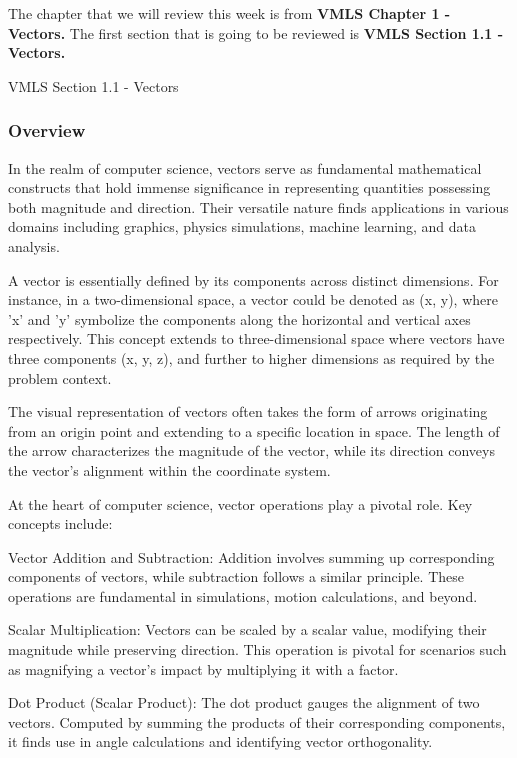 The chapter that we will review this week is from \textbf{VMLS Chapter 1 - Vectors.} The first section that is going to be reviewed is \textbf{VMLS Section 1.1 - Vectors.}

\begin{notes}{VMLS Section 1.1 - Vectors}
    \subsubsection*{Overview}

    In the realm of computer science, vectors serve as fundamental mathematical constructs that hold immense significance in representing quantities possessing both magnitude and direction. Their 
    versatile nature finds applications in various domains including graphics, physics simulations, machine learning, and data analysis.

    A vector is essentially defined by its components across distinct dimensions. For instance, in a two-dimensional space, a vector could be denoted as (x, y), where 'x' and 'y' symbolize the 
    components along the horizontal and vertical axes respectively. This concept extends to three-dimensional space where vectors have three components (x, y, z), and further to higher dimensions 
    as required by the problem context.

    The visual representation of vectors often takes the form of arrows originating from an origin point and extending to a specific location in space. The length of the arrow characterizes the 
    magnitude of the vector, while its direction conveys the vector's alignment within the coordinate system.

    At the heart of computer science, vector operations play a pivotal role. Key concepts include:

    Vector Addition and Subtraction: Addition involves summing up corresponding components of vectors, while subtraction follows a similar principle. These operations are fundamental in simulations, 
    motion calculations, and beyond.

    Scalar Multiplication: Vectors can be scaled by a scalar value, modifying their magnitude while preserving direction. This operation is pivotal for scenarios such as magnifying a vector's impact 
    by multiplying it with a factor.

    Dot Product (Scalar Product): The dot product gauges the alignment of two vectors. Computed by summing the products of their corresponding components, it finds use in angle calculations and 
    identifying vector orthogonality.


\end{notes}
